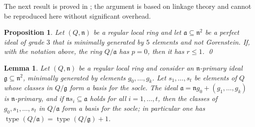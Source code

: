 \documentclass{amsart}
\theoremstyle{bfupright head,upright body}
\theoremstyle{fixed bf head,slanted body}
\newtheorem{prp}[res]{Proposition}      \newtheorem*{prp*}{Proposition}
\newtheorem{lem}[res]{Lemma}            \newtheorem*{lem*}{Lemma}
\theoremstyle{fixed bf head,upright body}
\theoremstyle{numbered paragraph}
\newcommand{\n}{\mathfrak{n}}
\newcommand{\type}[2][R]{\operatorname{type}_{#1}#2}
\newcommand{\fa}{\mathfrak{a}}
\newcommand{\fg}{\mathfrak{g}}
\numberwithin{equation}{res}
\begin{document}
The next result is proved in \cite{CVW-2}; the argument is based on
linkage theory and cannot be reproduced here without significant
overhead.

\begin{prp}
  \label{prp:mu5}
  Let $(Q,\n)$ be a regular local ring and let $\fa \subseteq \n^2$ be
  a perfect ideal of grade $3$ that is minimally generated by $5$
  elements and not Gorenstein.  If, with the notation above, the ring
  $Q/\fa$ has $p=0$, then it has $r \le 1$. \qed
\end{prp}

\begin{lem}
  \label{lem:type}
  Let $(Q,\n)$ be a regular local ring and consider an $\n$-primary
  ideal $\fg \subseteq \n^2$, minimally generated by elements
  $g_0,\ldots,g_k$. Let $s_1,\ldots,s_t$ be elements of $Q$ whose
  classes in $Q/\fg$ form a basis for the socle. The ideal $\fa = \n
  g_0 + (g_1,\ldots,g_k)$ is $\n$-primary, and if $\n s_i \subseteq
  \fa$ holds for all $i=1,\ldots,t$, then the classes of
  $g_0,s_1,\ldots,s_t$ in $Q/\fa$ form a basis for the socle; in
  particular one has $\type[]{(Q/\fa)} = \type[]{(Q/\fg)} +1$.
\end{lem}
\end{document}
